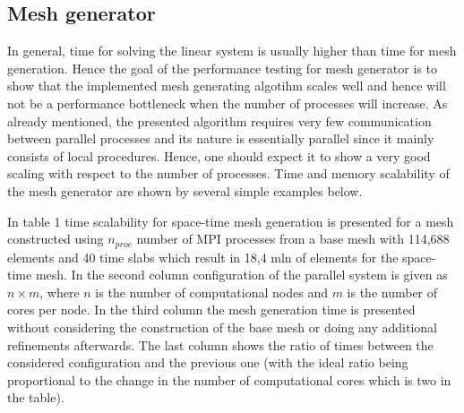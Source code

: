 \documentclass[12pt]{article}
\begin{document}
\subsection{Mesh generator}
In general, time for solving the linear system is usually higher than time for mesh generation. Hence the goal of the performance testing for mesh generator is to show that the implemented mesh generating algotihm scales well and hence will not be a performance bottleneck when the number of processes will increase. As already mentioned, the presented algorithm requires very few communication between parallel processes and its nature is essentially parallel since it mainly consists of local procedures. Hence, one should expect it to show a very good scaling with respect to the number of processes. Time and memory scalability of the mesh generator are shown by several simple examples below.

In table 1  time scalability for space-time mesh generation is presented for a mesh constructed using $n_{proc}$ number of MPI processes from a base mesh with 114,688 elements and 40 time slabs which result in 18,4 mln of elements for the space-time mesh. In the second column  configuration of the parallel system is given as $n \times m$, where $n$ is the number of computational nodes and $m$ is the number of cores per node. In the third column the mesh generation time is presented without considering the construction of the base mesh or doing any additional refinements afterwards. The last column shows the ratio of times between the considered configuration and the previous one (with the ideal ratio being proportional to the change in the number of computational cores which is two in the table).


\end{document}
